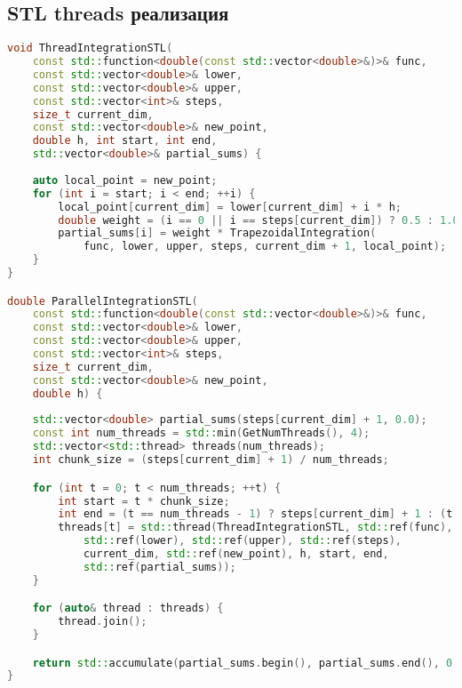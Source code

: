 \documentclass[14pt,a4paper]{extarticle}
\begin{document}
\subsection{STL threads реализация}
\begin{lstlisting}[language=C++]
void ThreadIntegrationSTL(
    const std::function<double(const std::vector<double>&)>& func,
    const std::vector<double>& lower,
    const std::vector<double>& upper,
    const std::vector<int>& steps,
    size_t current_dim,
    const std::vector<double>& new_point,
    double h, int start, int end,
    std::vector<double>& partial_sums) {
    
    auto local_point = new_point;
    for (int i = start; i < end; ++i) {
        local_point[current_dim] = lower[current_dim] + i * h;
        double weight = (i == 0 || i == steps[current_dim]) ? 0.5 : 1.0;
        partial_sums[i] = weight * TrapezoidalIntegration(
            func, lower, upper, steps, current_dim + 1, local_point);
    }
}

double ParallelIntegrationSTL(
    const std::function<double(const std::vector<double>&)>& func,
    const std::vector<double>& lower,
    const std::vector<double>& upper,
    const std::vector<int>& steps,
    size_t current_dim,
    const std::vector<double>& new_point,
    double h) {
    
    std::vector<double> partial_sums(steps[current_dim] + 1, 0.0);
    const int num_threads = std::min(GetNumThreads(), 4);
    std::vector<std::thread> threads(num_threads);
    int chunk_size = (steps[current_dim] + 1) / num_threads;

    for (int t = 0; t < num_threads; ++t) {
        int start = t * chunk_size;
        int end = (t == num_threads - 1) ? steps[current_dim] + 1 : (t + 1) * chunk_size;
        threads[t] = std::thread(ThreadIntegrationSTL, std::ref(func), 
            std::ref(lower), std::ref(upper), std::ref(steps),
            current_dim, std::ref(new_point), h, start, end, 
            std::ref(partial_sums));
    }

    for (auto& thread : threads) {
        thread.join();
    }

    return std::accumulate(partial_sums.begin(), partial_sums.end(), 0.0) * h;
}
\end{lstlisting}
\end{document}
